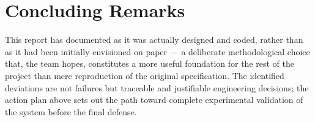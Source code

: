 \section{Concluding Remarks}
\label{sec:bilan_conclusion}

This report has documented \esibot{} as it was actually designed and coded, rather than
as it had been initially envisioned on paper --- a deliberate methodological choice
that, the team hopes, constitutes a more useful foundation for the rest of the project
than mere reproduction of the original specification. The identified deviations are not
failures but traceable and justifiable engineering decisions; the action plan above sets
out the path toward complete experimental validation of the system before the final
defense.
